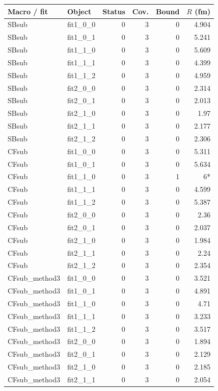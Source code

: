\documentclass[11pt,a4paper]{article}
\begin{document}
{\scriptsize\begin{longtable}{llrrrr}\hline Macro / fit & Object & Status & Cov. & Bound & $R$ (fm)\\\hline\endhead
SBsub & fit1\_0\_0 & 0 & 3 & 0 & 4.904\\
SBsub & fit1\_0\_1 & 0 & 3 & 0 & 5.241\\
SBsub & fit1\_1\_0 & 0 & 3 & 0 & 5.609\\
SBsub & fit1\_1\_1 & 0 & 3 & 0 & 4.399\\
SBsub & fit1\_1\_2 & 0 & 3 & 0 & 4.959\\
SBsub & fit2\_0\_0 & 0 & 3 & 0 & 2.314\\
SBsub & fit2\_0\_1 & 0 & 3 & 0 & 2.013\\
SBsub & fit2\_1\_0 & 0 & 3 & 0 & 1.97\\
SBsub & fit2\_1\_1 & 0 & 3 & 0 & 2.177\\
SBsub & fit2\_1\_2 & 0 & 3 & 0 & 2.306\\
CFsub & fit1\_0\_0 & 0 & 3 & 0 & 5.311\\
CFsub & fit1\_0\_1 & 0 & 3 & 0 & 5.634\\
CFsub & fit1\_1\_0 & 0 & 3 & 1 & 6*\\
CFsub & fit1\_1\_1 & 0 & 3 & 0 & 4.599\\
CFsub & fit1\_1\_2 & 0 & 3 & 0 & 5.387\\
CFsub & fit2\_0\_0 & 0 & 3 & 0 & 2.36\\
CFsub & fit2\_0\_1 & 0 & 3 & 0 & 2.037\\
CFsub & fit2\_1\_0 & 0 & 3 & 0 & 1.984\\
CFsub & fit2\_1\_1 & 0 & 3 & 0 & 2.24\\
CFsub & fit2\_1\_2 & 0 & 3 & 0 & 2.354\\
CFsub\_method3 & fit1\_0\_0 & 0 & 3 & 0 & 3.521\\
CFsub\_method3 & fit1\_0\_1 & 0 & 3 & 0 & 4.891\\
CFsub\_method3 & fit1\_1\_0 & 0 & 3 & 0 & 4.71\\
CFsub\_method3 & fit1\_1\_1 & 0 & 3 & 0 & 3.233\\
CFsub\_method3 & fit1\_1\_2 & 0 & 3 & 0 & 3.517\\
CFsub\_method3 & fit2\_0\_0 & 0 & 3 & 0 & 1.894\\
CFsub\_method3 & fit2\_0\_1 & 0 & 3 & 0 & 2.129\\
CFsub\_method3 & fit2\_1\_0 & 0 & 3 & 0 & 2.185\\
CFsub\_method3 & fit2\_1\_1 & 0 & 3 & 0 & 2.054\\

\end{longtable}}
\end{document}
